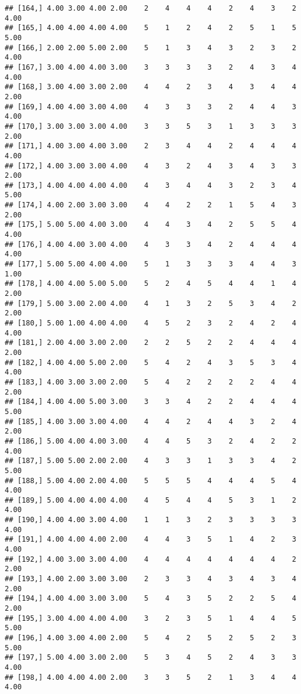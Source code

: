 \documentclass[]{article}
\begin{document}
\begin{verbatim}
## [164,] 4.00 3.00 4.00 2.00    2    4    4    4    2    4    3    2 4.00
## [165,] 4.00 4.00 4.00 4.00    5    1    2    4    2    5    1    5 5.00
## [166,] 2.00 2.00 5.00 2.00    5    1    3    4    3    2    3    2 4.00
## [167,] 3.00 4.00 4.00 3.00    3    3    3    3    2    4    3    4 4.00
## [168,] 3.00 4.00 3.00 2.00    4    4    2    3    4    3    4    4 2.00
## [169,] 4.00 4.00 3.00 4.00    4    3    3    3    2    4    4    3 4.00
## [170,] 3.00 3.00 3.00 4.00    3    3    5    3    1    3    3    3 2.00
## [171,] 4.00 3.00 4.00 3.00    2    3    4    4    2    4    4    4 4.00
## [172,] 4.00 3.00 3.00 4.00    4    3    2    4    3    4    3    3 2.00
## [173,] 4.00 4.00 4.00 4.00    4    3    4    4    3    2    3    4 5.00
## [174,] 4.00 2.00 3.00 3.00    4    4    2    2    1    5    4    3 2.00
## [175,] 5.00 5.00 4.00 3.00    4    4    3    4    2    5    5    4 4.00
## [176,] 4.00 4.00 3.00 4.00    4    3    3    4    2    4    4    4 4.00
## [177,] 5.00 5.00 4.00 4.00    5    1    3    3    3    4    4    3 1.00
## [178,] 4.00 4.00 5.00 5.00    5    2    4    5    4    4    1    4 2.00
## [179,] 5.00 3.00 2.00 4.00    4    1    3    2    5    3    4    2 2.00
## [180,] 5.00 1.00 4.00 4.00    4    5    2    3    2    4    2    4 4.00
## [181,] 2.00 4.00 3.00 2.00    2    2    5    2    2    4    4    4 2.00
## [182,] 4.00 4.00 5.00 2.00    5    4    2    4    3    5    3    4 4.00
## [183,] 4.00 3.00 3.00 2.00    5    4    2    2    2    2    4    4 2.00
## [184,] 4.00 4.00 5.00 3.00    3    3    4    2    2    4    4    4 5.00
## [185,] 4.00 3.00 3.00 4.00    4    4    2    4    4    3    2    4 2.00
## [186,] 5.00 4.00 4.00 3.00    4    4    5    3    2    4    2    2 4.00
## [187,] 5.00 5.00 2.00 2.00    4    3    3    1    3    3    4    2 5.00
## [188,] 5.00 4.00 2.00 4.00    5    5    5    4    4    4    5    4 4.00
## [189,] 5.00 4.00 4.00 4.00    4    5    4    4    5    3    1    2 4.00
## [190,] 4.00 4.00 3.00 4.00    1    1    3    2    3    3    3    3 4.00
## [191,] 4.00 4.00 4.00 2.00    4    4    3    5    1    4    2    3 4.00
## [192,] 4.00 3.00 3.00 4.00    4    4    4    4    4    4    4    2 2.00
## [193,] 4.00 2.00 3.00 3.00    2    3    3    4    3    4    3    4 2.00
## [194,] 4.00 4.00 3.00 3.00    5    4    3    5    2    2    5    4 2.00
## [195,] 3.00 4.00 4.00 4.00    3    2    3    5    1    4    4    5 5.00
## [196,] 4.00 3.00 4.00 2.00    5    4    2    5    2    5    2    3 5.00
## [197,] 5.00 4.00 3.00 2.00    5    3    4    5    2    4    3    3 4.00
## [198,] 4.00 4.00 4.00 2.00    3    3    5    2    1    3    4    4 4.00

\end{verbatim}
\end{document}
